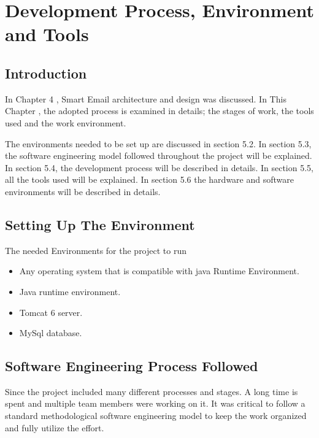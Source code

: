 
\chapter{Development Process, Environment and Tools} %

\label{Chapter5} %


\section{Introduction}
In Chapter 4 , Smart Email architecture and design was discussed. In This Chapter , the adopted process is examined in details; the stages of work, the tools used and the work environment.

The environments needed to be set up are discussed in section 5.2. In section 5.3, the software engineering model followed throughout the project will be explained. In section 5.4, the development process will be described in details. In section 5.5, all the tools used will be explained. In section 5.6 the hardware and software environments will be described in details.
\section{Setting Up The Environment}
The needed Environments for the project to run
\begin{itemize}
\item Any operating system that is compatible with java Runtime Environment.
\item Java runtime environment.
\item Tomcat 6 server.
\item MySql database.
\end{itemize}

\section{Software Engineering Process Followed}
Since the project included many different processes and stages. A long time is spent and multiple team members were working on it. It was critical to follow a standard methodological software engineering model to keep the work organized and fully utilize the effort.


